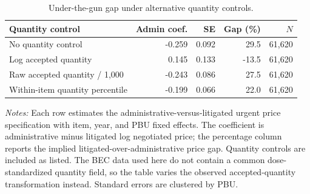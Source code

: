 \begin{table}[ht]
\centering
\caption{Under-the-gun gap under alternative quantity controls.}
\label{tab:quantity_definition_robustness}
\begin{threeparttable}
\small
\setlength{\tabcolsep}{5pt}
\begin{tabular}{p{.42\linewidth}rrrr}
\toprule
Quantity control & Admin coef. & SE & Gap (\%) & $N$ \\
\midrule
No quantity control & -0.259 & 0.092 & 29.5 & 61,620 \\
Log accepted quantity & 0.145 & 0.133 & -13.5 & 61,620 \\
Raw accepted quantity / 1,000 & -0.243 & 0.086 & 27.5 & 61,620 \\
Within-item quantity percentile & -0.199 & 0.066 & 22.0 & 61,620 \\
\bottomrule
\end{tabular}
\begin{tablenotes}[flushleft]\footnotesize
\item \textit{Notes:} Each row estimates the administrative-versus-litigated urgent price specification with item, year, and PBU fixed effects. The coefficient is administrative minus litigated log negotiated price; the percentage column reports the implied litigated-over-administrative price gap. Quantity controls are included as listed. The BEC data used here do not contain a common dose-standardized quantity field, so the table varies the observed accepted-quantity transformation instead. Standard errors are clustered by PBU.
\end{tablenotes}
\end{threeparttable}
\end{table}
